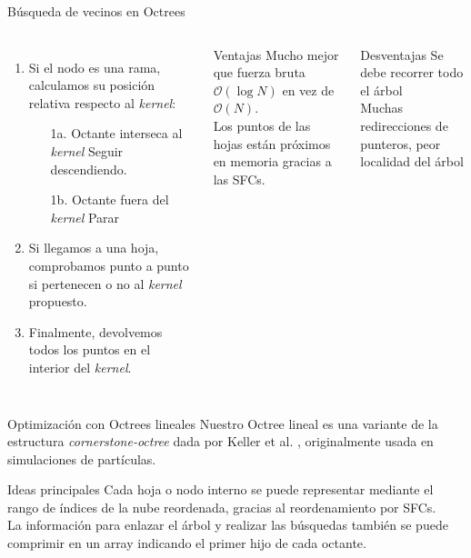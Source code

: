 \documentclass[aspectratio=169]{beamer}
\begin{document}
\begin{frame}{Búsqueda de vecinos en Octrees}
    \begin{columns}
    \begin{enumerate}
        \item Si el nodo es una rama, calculamos su posición relativa respecto al \textit{kernel}:
          \begin{enumerate}
               \item[1a.] Octante interseca al \textit{kernel} \textrightarrow\: Seguir descendiendo.
               \item[1b.] Octante fuera del \textit{kernel} \textrightarrow\:  Parar
          \end{enumerate}
        \item Si llegamos a una hoja, comprobamos punto a punto si pertenecen o no al \textit{kernel} propuesto. 
        \item Finalmente, devolvemos todos los puntos en el interior del \textit{kernel}.
    \end{enumerate}
        \begin{exampleblock}{Ventajas}
            \textrightarrow \: Mucho mejor que fuerza bruta $\mathcal{O}(\log{N})$ en vez de $\mathcal{O}(N)$. \\
            \textrightarrow \: Los puntos de las hojas están próximos en memoria gracias a las SFCs. \\
        \end{exampleblock}
        \begin{alertblock}{Desventajas}
            \textrightarrow \: Se debe recorrer todo el árbol \\
            \textrightarrow \: Muchas redirecciones de punteros, peor localidad del árbol \\
        \end{alertblock}
    \end{columns}

\end{frame}

\begin{frame}{Optimización con Octrees lineales}
        Nuestro Octree lineal es una variante de la estructura \textit{cornerstone-octree} dada por Keller et al. \cite{Keller2023}, originalmente usada en simulaciones de partículas.
        \vspace{1em}
        \begin{block}{Ideas principales}
            \textrightarrow \: Cada hoja o nodo interno se puede representar mediante el rango de índices de la nube reordenada, gracias al reordenamiento por SFCs. \\
            \textrightarrow \: La información para enlazar el árbol y realizar las búsquedas también se puede comprimir en un array indicando el primer hijo de cada octante.
        \end{block}    
\end{frame}
\end{document}
